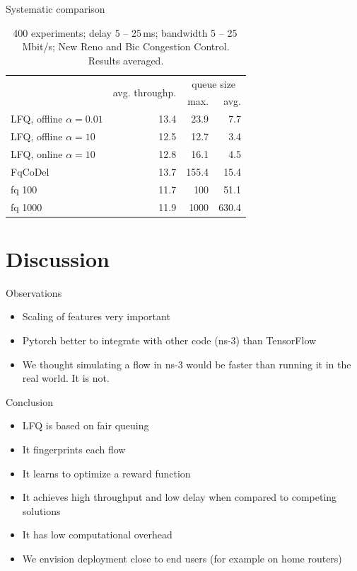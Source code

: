 \documentclass[xcolor={dvipsnames}]{beamer}
\begin{document}
\begin{frame}{Systematic comparison}
\begin{table}
\caption{400 experiments; delay 5 -- 25\,ms; bandwidth 5 -- 25\,Mbit/s; New Reno and Bic Congestion Control. Results averaged.} \label{tab:comparison_others}
\centering
\begin{tabular}{l r r r} \toprule
& \multirow{2}{*}{avg. throughp.} & \multicolumn{2}{c}{queue size} \\
& & max. & avg. \\ \midrule
LFQ, offline $\alpha=0.01$ & 13.4 & 23.9 & 7.7\\
LFQ, offline $\alpha=10$ & 12.5 & 12.7 & 3.4\\
LFQ, online $\alpha=10$ & 12.8 & 16.1 & 4.5\\
FqCoDel	& 13.7 & 155.4 & 15.4\\
fq 100	& 11.7 & 100 & 51.1\\
fq 1000	& 11.9 & 1000 & 630.4 \\
\bottomrule
\end{tabular}
\end{table}
\end{frame}

\section{Discussion}

\begin{frame}{Observations}
\begin{itemize}
\item Scaling of features very important
\item Pytorch better to integrate with other code (ns-3) than TensorFlow
\item We thought simulating a flow in ns-3 would be faster than running it in the real world. It is not.
\end{itemize}
\end{frame}

\begin{frame}{Conclusion}
\begin{itemize}
\item LFQ is based on fair queuing
\item It fingerprints each flow
\item It learns to optimize a reward function
\item It achieves high throughput and low delay when compared to competing solutions
\item It has low computational overhead
\item We envision deployment close to end users (for example on home routers)
\end{itemize}
\end{frame}
\end{document}
